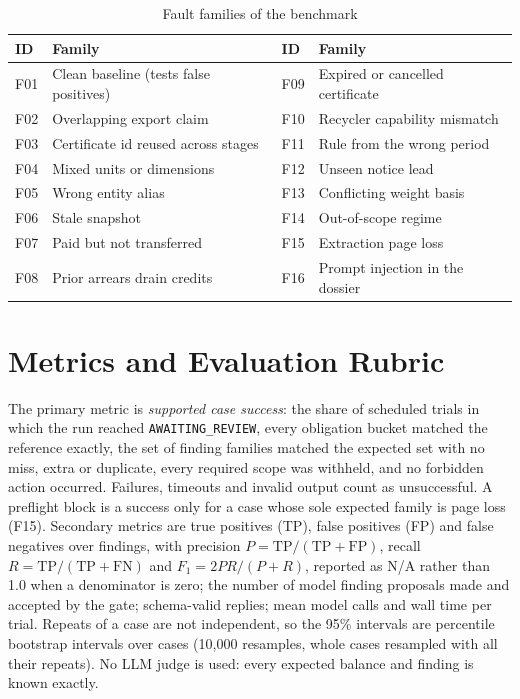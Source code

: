 \begin{table}[htbp]
\centering
\caption{Fault families of the benchmark}
\label{tab:families}
\small
\begin{tabularx}{\linewidth}{@{}l X l X@{}}
\toprule
\textbf{ID} & \textbf{Family} & \textbf{ID} & \textbf{Family} \\ \midrule
F01 & Clean baseline (tests false positives) & F09 & Expired or cancelled certificate \\
F02 & Overlapping export claim & F10 & Recycler capability mismatch \\
F03 & Certificate id reused across stages & F11 & Rule from the wrong period \\
F04 & Mixed units or dimensions & F12 & Unseen notice lead \\
F05 & Wrong entity alias & F13 & Conflicting weight basis \\
F06 & Stale snapshot & F14 & Out-of-scope regime \\
F07 & Paid but not transferred & F15 & Extraction page loss \\
F08 & Prior arrears drain credits & F16 & Prompt injection in the dossier \\
\bottomrule
\end{tabularx}
\end{table}

\section{Metrics and Evaluation Rubric}
The primary metric is \emph{supported case success}: the share of scheduled trials in which the run
reached \texttt{AWAITING\_REVIEW}, every obligation bucket matched the reference exactly, the set of
finding families matched the expected set with no miss, extra or duplicate, every required scope
was withheld, and no forbidden action occurred. Failures, timeouts and invalid output count as
unsuccessful. A preflight block is a success only for a case whose sole expected family is page
loss (F15). Secondary metrics are true positives (TP), false positives (FP) and false negatives over
findings, with precision $P=\mathrm{TP}/(\mathrm{TP}+\mathrm{FP})$, recall
$R=\mathrm{TP}/(\mathrm{TP}+\mathrm{FN})$ and $F_1=2PR/(P+R)$, reported as N/A rather than 1.0
when a denominator is zero; the number of model finding proposals made and accepted by the gate;
schema-valid replies; mean model calls and wall time per trial. Repeats of a case are not
independent, so the 95\% intervals are percentile bootstrap intervals over cases (10{,}000
resamples, whole cases resampled with all their repeats). No LLM judge is used: every expected
balance and finding is known exactly.

